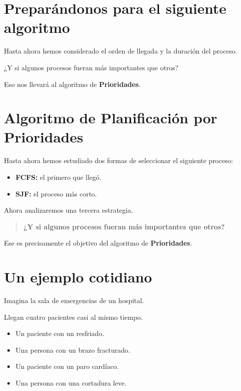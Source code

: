 \documentclass[
  spanish,
  letterpaper,
]{scrbook}
\providecommand{\tightlist}{%
  \setlength{\itemsep}{0pt}\setlength{\parskip}{0pt}}
\begin{document}

\chapter{Preparándonos para el siguiente
algoritmo}\label{preparuxe1ndonos-para-el-siguiente-algoritmo-1}

Hasta ahora hemos considerado el orden de llegada y la duración del
proceso.

¿Y si algunos procesos fueran más importantes que otros?

Eso nos llevará al algoritmo de \textbf{Prioridades}.


\chapter{Algoritmo de Planificación por
Prioridades}\label{algoritmo-de-planificaciuxf3n-por-prioridades}

Hasta ahora hemos estudiado dos formas de seleccionar el siguiente
proceso:

\begin{itemize}
\tightlist
\item
  \textbf{FCFS:} el primero que llegó.
\item
  \textbf{SJF:} el proceso más corto.
\end{itemize}

Ahora analizaremos una tercera estrategia.

\begin{quote}
\textbf{¿Y si algunos procesos fueran más importantes que otros?}
\end{quote}

Ese es precisamente el objetivo del algoritmo de \textbf{Prioridades}.


\chapter{Un ejemplo cotidiano}\label{un-ejemplo-cotidiano-2}

Imagina la sala de emergencias de un hospital.

Llegan cuatro pacientes casi al mismo tiempo.

\begin{itemize}
\tightlist
\item
  Un paciente con un resfriado.
\item
  Una persona con un brazo fracturado.
\item
  Un paciente con un paro cardíaco.
\item
  Una persona con una cortadura leve.
\end{itemize}
\end{document}
